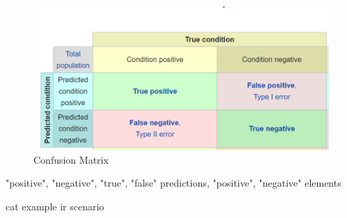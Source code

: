 \begin{figure}[t]
    \centering
    \includegraphics[width=\textwidth]{3_basics/4_metrics/1_confusion_matrix/matrix}
    \caption{Confusion Matrix}
    \label{fig:3_basics/4_metrics/1_confusion_matrix}
\end{figure}

"positive", "negative", "true", "false" predictions, "positive", "negative" elements

cat example
ir scenario
